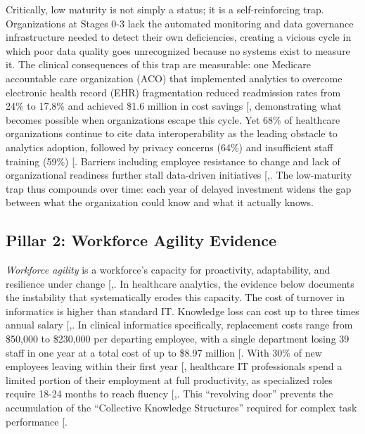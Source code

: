 \documentclass[
  american,
  11pt,
  letterpaper,
  oneside  ,captions=tableheading
]{scrartcl}
\begin{document}
Critically, low maturity is not simply a status; it is a
self-reinforcing trap. Organizations at Stages 0-3 lack the automated
monitoring and data governance infrastructure needed to detect their own
deficiencies, creating a vicious cycle in which poor data quality goes
unrecognized because no systems exist to measure it. The clinical
consequences of this trap are measurable: one Medicare accountable care
organization (ACO) that implemented analytics to overcome electronic
health record (EHR) fragmentation reduced readmission rates from 24\% to
17.8\% and achieved \$1.6 million in cost savings
{[}\citeproc{ref-latrella2024}{47}{]}, demonstrating what becomes
possible when organizations escape this cycle. Yet 68\% of healthcare
organizations continue to cite data interoperability as the leading
obstacle to analytics adoption, followed by privacy concerns (64\%) and
insufficient staff training (59\%) {[}\citeproc{ref-nashid2023}{48}{]}.
Barriers including employee resistance to change and lack of
organizational readiness further stall data-driven initiatives
{[},\citeproc{ref-kamble2019}{50}{]}. The
low-maturity trap thus compounds over time: each year of delayed
investment widens the gap between what the organization could know and
what it actually knows.

\subsection{Pillar 2: Workforce Agility
Evidence}\label{pillar-2-workforce-agility-evidence}

\emph{Workforce agility} is a workforce's capacity for proactivity,
adaptability, and resilience under change
{[},\citeproc{ref-tessarini2021}{52}{]}. In
healthcare analytics, the evidence below documents the instability that
systematically erodes this capacity. The cost of turnover in informatics
is higher than standard IT. Knowledge loss can cost up to three times
annual salary
{[},\citeproc{ref-wynendaele2025}{53}{]}.
In clinical informatics specifically, replacement costs range from
\$50,000 to \$230,000 per departing employee, with a single department
losing 39 staff in one year at a total cost of up to \$8.97 million
{[}\citeproc{ref-hackney2024}{54}{]}. With 30\% of new employees leaving
within their first year {[}\citeproc{ref-nsi2025}{19}{]}, healthcare IT
professionals spend a limited portion of their employment at full
productivity, as specialized roles require 18-24 months to reach fluency
{[},\citeproc{ref-konrad2022}{20}{]}. This
``revolving door'' prevents the accumulation of the ``Collective
Knowledge Structures'' required for complex task performance
{[}\citeproc{ref-rao2006}{11}{]}.
\end{document}
